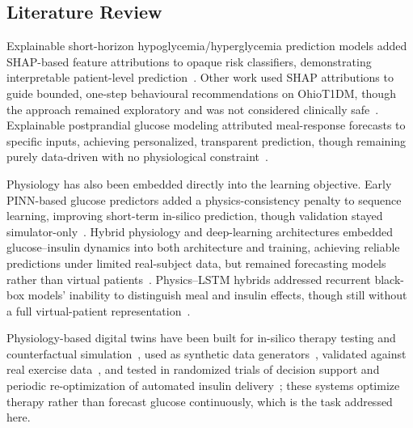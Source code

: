 \documentclass[journal]{IEEEtran}
\begin{document}
\subsection{Literature Review}

Explainable short-horizon hypoglycemia/hyperglycemia prediction models added SHAP-based feature attributions to opaque risk classifiers, demonstrating interpretable patient-level prediction~\cite{ref3}. Other work used SHAP attributions to guide bounded, one-step behavioural recommendations on OhioT1DM, though the approach remained exploratory and was not considered clinically safe~\cite{ref6}. Explainable postprandial glucose modeling attributed meal-response forecasts to specific inputs, achieving personalized, transparent prediction, though remaining purely data-driven with no physiological constraint~\cite{ref7}.

Physiology has also been embedded directly into the learning objective. Early PINN-based glucose predictors added a physics-consistency penalty to sequence learning, improving short-term in-silico prediction, though validation stayed simulator-only~\cite{ref9}. Hybrid physiology and deep-learning architectures embedded glucose--insulin dynamics into both architecture and training, achieving reliable predictions under limited real-subject data, but remained forecasting models rather than virtual patients~\cite{ref11}. Physics--LSTM hybrids addressed recurrent black-box models' inability to distinguish meal and insulin effects, though still without a full virtual-patient representation~\cite{ref12}.

Physiology-based digital twins have been built for in-silico therapy testing and counterfactual simulation~\cite{ref13,ref14}, used as synthetic data generators~\cite{ref15}, validated against real exercise data~\cite{ref16}, and tested in randomized trials of decision support and periodic re-optimization of automated insulin delivery~\cite{ref17,ref18}; these systems optimize therapy rather than forecast glucose continuously, which is the task addressed here.
\end{document}
